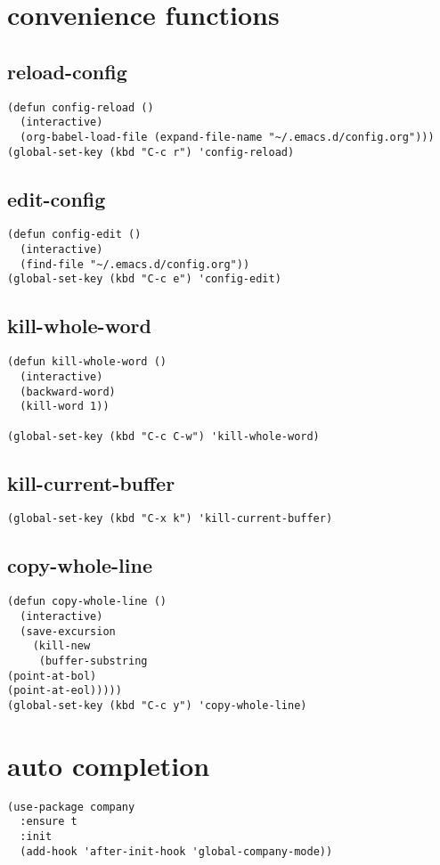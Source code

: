 \documentclass[11pt]{article}
\begin{document}
\section{convenience functions}
\label{sec:orgae513f2}
\subsection{reload-config}
\label{sec:org3e1bd3a}
\begin{verbatim}
(defun config-reload ()
  (interactive)
  (org-babel-load-file (expand-file-name "~/.emacs.d/config.org")))
(global-set-key (kbd "C-c r") 'config-reload)
\end{verbatim}
\subsection{edit-config}
\label{sec:org41a2eb5}
\begin{verbatim}
(defun config-edit ()
  (interactive)
  (find-file "~/.emacs.d/config.org"))
(global-set-key (kbd "C-c e") 'config-edit)
\end{verbatim}
\subsection{kill-whole-word}
\label{sec:org85dbe10}
\begin{verbatim}
(defun kill-whole-word ()
  (interactive)
  (backward-word)
  (kill-word 1))

(global-set-key (kbd "C-c C-w") 'kill-whole-word)
\end{verbatim}
\subsection{kill-current-buffer}
\label{sec:orgad8bb89}
\begin{verbatim}
(global-set-key (kbd "C-x k") 'kill-current-buffer)
\end{verbatim}
\subsection{copy-whole-line}
\label{sec:orgd6aed78}
\begin{verbatim}
(defun copy-whole-line ()
  (interactive)
  (save-excursion
    (kill-new
     (buffer-substring
(point-at-bol)
(point-at-eol)))))
(global-set-key (kbd "C-c y") 'copy-whole-line)
\end{verbatim}
\section{auto completion}
\label{sec:org9b6fd6b}
\begin{verbatim}
(use-package company
  :ensure t
  :init
  (add-hook 'after-init-hook 'global-company-mode))
\end{verbatim}
\end{document}
